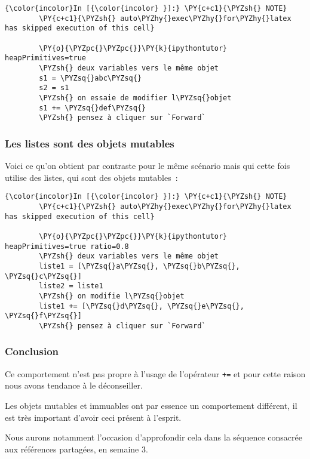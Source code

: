     \begin{Verbatim}[commandchars=\\\{\}]
{\color{incolor}In [{\color{incolor} }]:} \PY{c+c1}{\PYZsh{} NOTE}
        \PY{c+c1}{\PYZsh{} auto\PYZhy{}exec\PYZhy{}for\PYZhy{}latex has skipped execution of this cell}
        
        \PY{o}{\PYZpc{}\PYZpc{}}\PY{k}{ipythontutor} heapPrimitives=true
        \PYZsh{} deux variables vers le même objet
        s1 = \PYZsq{}abc\PYZsq{}
        s2 = s1
        \PYZsh{} on essaie de modifier l\PYZsq{}objet
        s1 += \PYZsq{}def\PYZsq{}
        \PYZsh{} pensez à cliquer sur `Forward`
\end{Verbatim}


    \hypertarget{les-listes-sont-des-objets-mutables}{%
\subsubsection{Les listes sont des objets
mutables}\label{les-listes-sont-des-objets-mutables}}

    Voici ce qu'on obtient par contraste pour le même scénario mais qui
cette fois utilise des listes, qui sont des objets mutables~:

    \begin{Verbatim}[commandchars=\\\{\}]
{\color{incolor}In [{\color{incolor} }]:} \PY{c+c1}{\PYZsh{} NOTE}
        \PY{c+c1}{\PYZsh{} auto\PYZhy{}exec\PYZhy{}for\PYZhy{}latex has skipped execution of this cell}
        
        \PY{o}{\PYZpc{}\PYZpc{}}\PY{k}{ipythontutor} heapPrimitives=true ratio=0.8
        \PYZsh{} deux variables vers le même objet
        liste1 = [\PYZsq{}a\PYZsq{}, \PYZsq{}b\PYZsq{}, \PYZsq{}c\PYZsq{}]
        liste2 = liste1
        \PYZsh{} on modifie l\PYZsq{}objet
        liste1 += [\PYZsq{}d\PYZsq{}, \PYZsq{}e\PYZsq{}, \PYZsq{}f\PYZsq{}]
        \PYZsh{} pensez à cliquer sur `Forward`
\end{Verbatim}


    \hypertarget{conclusion}{%
\subsubsection{Conclusion}\label{conclusion}}

    Ce comportement n'est pas propre à l'usage de l'opérateur \texttt{+=} et
pour cette raison nous avons tendance à le déconseiller.

Les objets mutables et immuables ont par essence un comportement
différent, il est très important d'avoir ceci présent à l'esprit.

Nous aurons notamment l'occasion d'approfondir cela dans la séquence
consacrée aux références partagées, en semaine 3.


    
    
    
